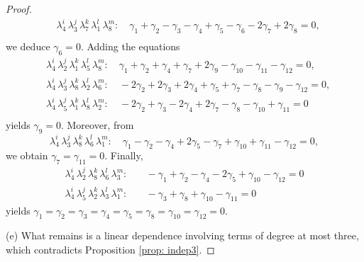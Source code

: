 \documentclass[12pt,dvipsnames,accepted=2016-08-18,a4paper,onecolumn]{quantumarticle}
\numberwithin{equation}{section}
\theoremstyle{definition}
\begin{document}
\begin{proof}
\begin{align*}
&\lambda_4^i\, \lambda_3^j\, \lambda_7^k\, \lambda_1^l\, \lambda_8^m: \quad\gamma_1 + \gamma_2 - \gamma_3 - \gamma_4 + \gamma_5 - \gamma_6 - 2 \gamma_7 + 2 \gamma_8 = 0,\\
\end{align*}
 we deduce $\gamma_6=0.$ Adding the equations
\begin{align*}
&\lambda_4^i\, \lambda_2^j\, \lambda_1^k\, \lambda_5^l\, \lambda_8^m: \quad    \gamma_1 + \gamma_2 + \gamma_4 + \gamma_7 + 2 \gamma_9 - \gamma_{10} - \gamma_{11} - \gamma_{12} = 0,\\
&\lambda_4^i\, \lambda_3^j\, \lambda_8^k\, \lambda_2^l\, \lambda_6^m: \quad-2 \gamma_2 + 2 \gamma_3 + 2 \gamma_4 + \gamma_5 + \gamma_7 - \gamma_8 - \gamma_9 - \gamma_{12} = 0,\\
&\lambda_4^i\, \lambda_5^j\, \lambda_1^k\, \lambda_8^l\, \lambda_2^m: \quad-2 \gamma_2 + \gamma_3 - 2 \gamma_4 + 2 \gamma_7 - \gamma_8 - \gamma_{10} + \gamma_{11} = 0\\
\end{align*}
yields $\gamma_9=0.$
Moreover, from
$$
\lambda_4^i\, \lambda_3^j\, \lambda_8^k\, \lambda_6^l\, \lambda_1^m: \quad \gamma_1 - \gamma_2 - \gamma_4 + 2 \gamma_5 - \gamma_7 + \gamma_{10} + \gamma_{11} - \gamma_{12} = 0,
$$
we obtain $\gamma_7=\gamma_{11}=0.$
Finally,
\begin{align*}
    \lambda_4^i\, \lambda_2^j\, \lambda_8^k\, \lambda_6^l\, \lambda_3^m: & \quad -\gamma_1 + \gamma_2 - \gamma_4 - 2 \gamma_5 + \gamma_{10} - \gamma_{12} = 0\\
    \lambda_4^i\, \lambda_5^j\, \lambda_2^k\, \lambda_3^l\, \lambda_1^m: & \quad -\gamma_3+\gamma_8+\gamma_{10}-\gamma_{11}=0
\end{align*}
yields $\gamma_1=\gamma_2=\gamma_3=\gamma_4=\gamma_5=\gamma_8=\gamma_{10}=\gamma_{12}=0.$


(e) What remains is a linear dependence involving terms of degree at most three, which contradicts Proposition \ref{prop: indep3}.
\end{proof}
\end{document}
